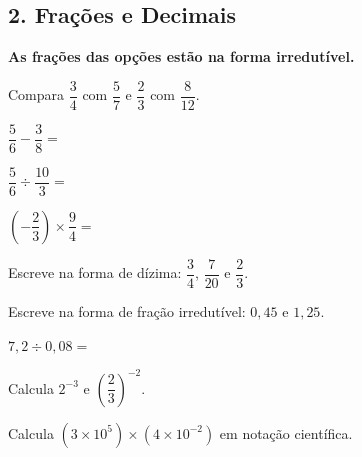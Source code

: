 \documentclass[12pt,a4paper]{article}
\begin{document}
\subsection*{2. Frações e Decimais}

\textbf{As frações das opções estão na forma irredutível.}

\begin{questoes}[resume]
    \item Compara
    $\dfrac{3}{4}$ com $\dfrac{5}{7}$ e
    $\dfrac{2}{3}$ com $\dfrac{8}{12}$.

    \item $\dfrac{5}{6} - \dfrac{3}{8} =$

    \item $\dfrac{5}{6} \div \dfrac{10}{3} =$

    \item $\left(-\dfrac{2}{3}\right) \times \dfrac{9}{4} =$

    \item Escreve na forma de dízima:
    $\dfrac{3}{4}$, $\dfrac{7}{20}$ e $\dfrac{2}{3}$.

    \item Escreve na forma de fração irredutível:
    $0{,}45$ e $1{,}25$.

    \item $7{,}2 \div 0{,}08 =$

    \item Calcula $2^{-3}$ e $\left(\dfrac{2}{3}\right)^{-2}$.

    \item Calcula
    $\left(3 \times 10^{5}\right) \times \left(4 \times 10^{-2}\right)$
    em notação científica.
\end{questoes}
\end{document}
